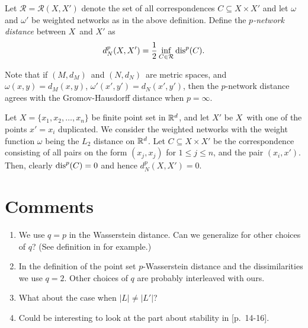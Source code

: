 	\begin{defn}
		Let $\mathcal{R}=\mathcal{R}(X,X')$ denote the set of all correspondences $C\subseteq X\times X'$ and let $\omega$ and $\omega'$ be weighted networks as in the above definition. Define the \textit{$p$-network distance} between $X$ and $X'$ as
		$$
		d_N^p(X,X')=\frac{1}{2}\inf_{C\in\mathcal{R}}\operatorname{dis}^p(C).
		$$
	\end{defn}
	Note that if $(M,d_M)$ and $(N,d_N)$ are metric spaces, and $\omega(x,y)=d_M(x,y)$, $\omega'(x',y')=d_N(x',y')$, then the $p$-network distance agrees with the Gromov-Hausdorff distance when $p=\infty$.
	
	\begin{ex}
		Let $X=\{x_1,x_2,\ldots, x_n\}$ be finite point set in $\mathbb{R}^d$, and let $X'$ be $X$ with one of the points $x'=x_i$ duplicated. We consider the weighted networks with the weight function $\omega$ being the $L_2$ distance on $\mathbb{R}^d$. Let $C\subseteq X\times X'$ be the correspondence consisting of all pairs on the form $(x_j, x_j)$ for $1\leq j\leq n$, and the pair $(x_i, x')$. Then, clearly $\operatorname{dis}^p(C)=0$ and hence $d_N^p(X,X')=0$.
	\end{ex}

	\section{Comments}
	\begin{enumerate}
		\item We use $q=p$ in the Wasserstein distance. Can we generalize for other choices of $q$? (See definition in \autocite{skraba2022wasserstein} for example.)
		\item In the definition of the point set $p$-Wasserstein distance and the dissimilarities we use $q=2$. Other choices of $q$ are probably interleaved with ours.
		\item What about the case when $|L|\neq|L'|$?
		\item Could be interesting to look at the part about stability in \autocite{Brun_2019}[p.~14-16].
	\end{enumerate}

	\printbibliography

